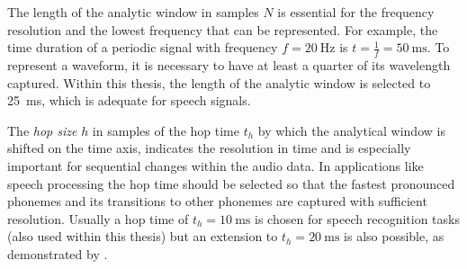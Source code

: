 The length of the analytic window in samples $N$ is essential for the frequency resolution and the lowest frequency that can be represented.
For example, the time duration of a periodic signal with frequency $f=\SI{20}{\hertz}$ is $t=\frac{1}{f} = \SI{50}{\milli\second}$.
To represent a waveform, it is necessary to have at least a quarter of its wavelength captured.
Within this thesis, the length of the analytic window is selected to \SI{25}{\milli\second}, which is adequate for speech signals.

The \emph{hop size} $h$ in samples of the hop time $t_h$ by which the analytical window is shifted on the time axis, indicates the resolution in time and is especially important for sequential changes within the audio data.
In applications like speech processing the hop time should be selected so that the fastest pronounced phonemes and its transitions to other phonemes are captured with sufficient resolution.
Usually a hop time of $t_{h}=\SI{10}{\milli\second}$ is chosen for speech recognition tasks (also used within this thesis) but an extension to $t_{h}=\SI{20}{\milli\second}$ is also possible, as demonstrated by \cite{Peter2020}.

